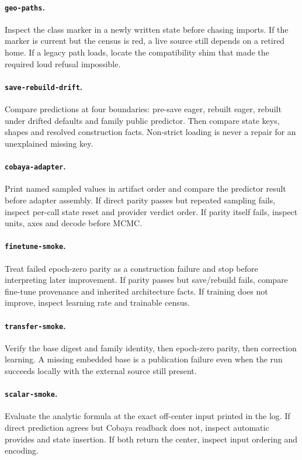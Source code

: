 \documentclass[10pt,aps,prd,twocolumn,nofootinbib]{revtex4-2}
\newcommand{\code}[1]{\texttt{#1}}
\begin{document}
\paragraph{\code{geo-paths}.}
Inspect the class marker in a newly written state before chasing imports.  If
the marker is current but the census is red, a live source still depends on a
retired home.  If a legacy path loads, locate the compatibility shim that made
the required loud refusal impossible.

\paragraph{\code{save-rebuild-drift}.}
Compare predictions at four boundaries: pre-save eager, rebuilt eager,
rebuilt under drifted defaults and family public predictor.  Then compare
state keys, shapes and resolved construction facts.  Non-strict loading is
never a repair for an unexplained missing key.

\paragraph{\code{cobaya-adapter}.}
Print named sampled values in artifact order and compare the predictor result
before adapter assembly.  If direct parity passes but repeated sampling fails,
inspect per-call state reset and provider verdict order.  If parity itself
fails, inspect units, axes and decode before MCMC.

\paragraph{\code{finetune-smoke}.}
Treat failed epoch-zero parity as a construction failure and stop before
interpreting later improvement.  If parity passes but save/rebuild fails,
compare fine-tune provenance and inherited architecture facts.  If training
does not improve, inspect learning rate and trainable census.

\paragraph{\code{transfer-smoke}.}
Verify the base digest and family identity, then epoch-zero parity, then
correction learning.  A missing embedded base is a publication failure even
when the run succeeds locally with the external source still present.

\paragraph{\code{scalar-smoke}.}
Evaluate the analytic formula at the exact off-center input printed in the
log.  If direct prediction agrees but Cobaya readback does not, inspect
automatic provides and state insertion.  If both return the center, inspect
input ordering and encoding.
\end{document}
